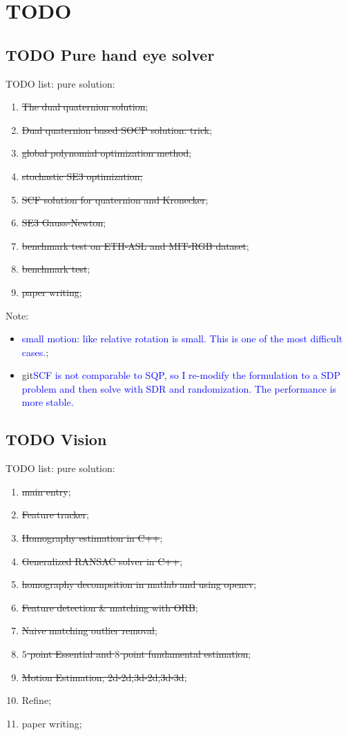 \documentclass[a4paper]{report}
\begin{document}
\chapter{TODO}
\section{TODO Pure hand eye solver}
TODO list:
pure solution:
\begin{enumerate}
	\item \sout{The dual quaternion solution};
	\item \sout{Dual quaternion based SOCP solution: trick};
	\item \sout{global polynomial optimization method};
	\item \sout{stochastic SE3 optimization;}
	\item \sout{SCF solution for quaternion and Kronecker};
	\item \sout{SE3 Gauss-Newton};
	\item \sout{benchmark test on ETH-ASL and MIT-RGB dataset};
	\item \sout{benchmark test};
	\item \sout{paper writing};
\end{enumerate}
Note: 
\begin{itemize}
\item \textcolor{blue}{small motion: like relative rotation is small. This is one of the most difficult cases.};
\item git\textcolor{blue}{SCF is not comparable to SQP, so I re-modify the formulation to a SDP problem and then solve with SDR and randomization. The performance is more stable.}
\end{itemize}

\section{TODO Vision}
TODO list:
pure solution:
\begin{enumerate}
	\item \sout{main entry};
	\item \sout{Feature tracker};
	\item \sout{Homography estimation in C++};
	\item \sout{Generalized RANSAC solver in C++};
	\item \sout{homography decompsition in matlab and using opencv};
	\item \sout{Feature detection \& matching with ORB};
	\item \sout{Naive matching outlier removal};
	\item \sout{$5$ point Essential and $8$ point fundamental estimation};
	\item \sout{Motion Estimation, 2d-2d,3d-2d,3d-3d};
	\item Refine;
	\item paper writing;
\end{enumerate}
\end{document}

